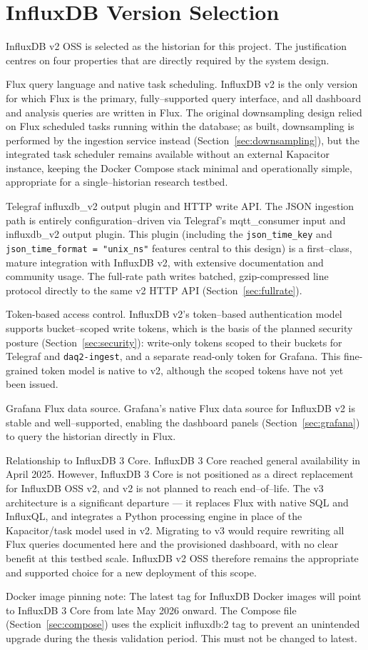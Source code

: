 \section{InfluxDB Version Selection}
InfluxDB v2 OSS is selected as the historian for this project. The justification centres on four properties that are directly required by the system design.

Flux query language and native task scheduling. InfluxDB v2 is the only version for which Flux is the primary, fully--supported query interface, and all dashboard and analysis queries are written in Flux. The original downsampling design relied on Flux scheduled tasks running within the database; as built, downsampling is performed by the ingestion service instead (Section~\ref{sec:downsampling}), but the integrated task scheduler remains available without an external Kapacitor instance, keeping the Docker Compose stack minimal and operationally simple, appropriate for a single--historian research testbed.

Telegraf influxdb\_v2 output plugin and HTTP write API. The JSON ingestion path is entirely configuration--driven via Telegraf's mqtt\_consumer input and influxdb\_v2 output plugin. This plugin (including the \texttt{json\_time\_key} and \texttt{json\_time\_format = "unix\_ns"} features central to this design) is a first--class, mature integration with InfluxDB v2, with extensive documentation and community usage. The full-rate path writes batched, gzip-compressed line protocol directly to the same v2 HTTP API (Section~\ref{sec:fullrate}).

Token-based access control. InfluxDB v2's token--based authentication model supports bucket--scoped write tokens, which is the basis of the planned security posture (Section~\ref{sec:security}): write-only tokens scoped to their buckets for Telegraf and \texttt{daq2-ingest}, and a separate read-only token for Grafana. This fine-grained token model is native to v2, although the scoped tokens have not yet been issued.

Grafana Flux data source. Grafana's native Flux data source for InfluxDB v2 is stable and well--supported, enabling the dashboard panels (Section~\ref{sec:grafana}) to query the historian directly in Flux.

Relationship to InfluxDB 3 Core. InfluxDB 3 Core reached general availability in April 2025.  However, InfluxDB 3 Core is not positioned as a direct replacement for InfluxDB OSS v2, and v2 is not planned to reach end--of--life. The v3 architecture is a significant departure — it replaces Flux with native SQL and InfluxQL, and integrates a Python processing engine in place of the Kapacitor/task model used in v2.  Migrating to v3 would require rewriting all Flux queries documented here and the provisioned dashboard, with no clear benefit at this testbed scale. InfluxDB v2 OSS therefore remains the appropriate and supported choice for a new deployment of this scope.

Docker image pinning note: The latest tag for InfluxDB Docker images will point to InfluxDB 3 Core from late May 2026 onward.  The Compose file (Section~\ref{sec:compose}) uses the explicit influxdb:2 tag to prevent an unintended upgrade during the thesis validation period. This must not be changed to latest.
